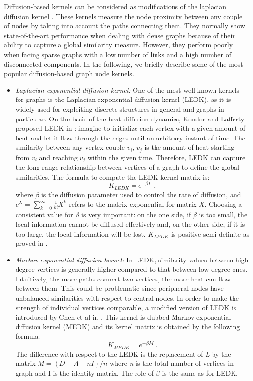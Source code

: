 Diffusion-based kernels can be considered as modifications of the laplacian diffusion kernel \cite{proceeding2}. These kernels measure the node proximity between any couple of nodes by taking into account the paths connecting them. They normally show state-of-the-art performance when dealing with dense graphs because of their ability to capture a global similarity measure. However, they perform poorly  when facing  sparse graphs with a low number of links and a high number of disconnected components. In the following, we briefly describe some of the most popular diffusion-based graph node kernels.
\begin{itemize}
\item \textit{Laplacian exponential diffusion kernel:} One of the most well-known kernels for graphs is the Laplacian exponential diffusion kernel (LEDK), as it is widely used for exploiting discrete structures in general and graphs in particular. On the basis of the heat diffusion dynamics, Kondor and Lafferty proposed LEDK in \cite{proceeding2}: imagine to initialize each vertex with a given amount of heat and let it flow through the edges until an arbitrary instant of time. The similarity between any vertex couple $v_{i}$, $v_{j}$ is the amount of heat starting from $v_{i}$ and reaching $v_{j}$ within the given time. Therefore, LEDK can capture the long range relationship between vertices of a graph to define the global similarities. The formula to compute the LEDK kernel matrix is:
\begin{equation}
K_{LEDK} = e^{-\beta L}\; ,
\end{equation}
where $\beta$ is the diffusion parameter used to control the rate of diffusion, and $e^{X}=\sum_{k=0}^{\infty} \frac{1}{k!}X^k$ refers to the matrix exponential for matrix $X$. Choosing a consistent value for $\beta$ is very important: on the one side, if $\beta$ is too small, the local information cannot be diffused effectively and, on the other side, if it is too large, the local information will be lost. $K_{LEDK}$ is positive semi-definite as proved in \cite{proceeding2}.

\item \textit{Markov exponential diffusion kernel:} In LEDK, similarity values between high degree vertices is generally higher compared to that between low degree ones. Intuitively, the more paths connect two vertices, the more heat can flow between them. This could be problematic since peripheral nodes have unbalanced similarities with respect to central nodes. In order to make the strength of individual vertices comparable, a modified version of LEDK is introduced by Chen et al in \cite{proceeding3}.  This kernel is dubbed Markov exponential diffusion kernel (MEDK) and its kernel matrix is obtained by the following formula:
\begin{equation}
K_{MEDK} = e^{-\beta M}\; .
\end{equation}
The difference with respect to the LEDK is the replacement of \textit{L} by the matrix $M = (D-A-nI)/n$ where \textit{n} is the total number of vertices in graph and I is the identity matrix. The role of $\beta$ is the same as for LEDK.


\end{itemize}
